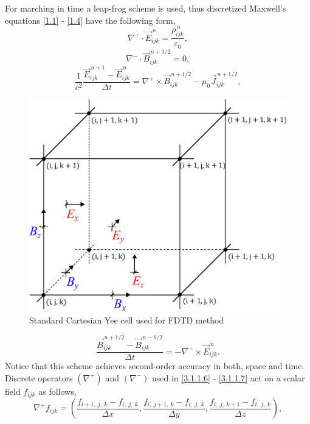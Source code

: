 For marching in time a leap-frog scheme is used, thus discretized Maxwell's equations \ref{1.1} - \ref{1.4} have the following form,
\begin{equation}
\label{3.1.1.6}
\nabla^{+} \cdot \vec{E}_{ijk}^{\,n} = \frac{\rho_{ijk}^{\,n}}{\varepsilon_0},
\end{equation}
\begin{equation}
\label{3.1.1.15}
\nabla^{-} \cdot \vec{B}_{ijk}^{\,n + 1/2} = 0,
\end{equation}
\begin{equation}
\label{3.1.1.16}
\frac{1}{c^{2}} \frac{\vec{E}_{ijk}^{\,n + 1} - \vec{E}_{ijk}^{\,n}}{\Delta t} = \nabla^{+} \times \vec{B}_{ijk}^{\,n + 1/2} - \mu_{0} \vec{J}_{ijk}^{\,n + 1/2},
\end{equation}
\begin{figure}[t]
	\centering
	\includegraphics[width=0.355\paperwidth]{./img/YEE/yee.eps}
	\caption{Standard Cartesian Yee cell used for FDTD method}
	\label{3.1.1.14}
\end{figure}
\begin{equation}
\label{3.1.1.7}
\frac{\vec{B}_{ijk}^{\,n + 1/2} - \vec{B}_{ijk}^{\,n - 1/2}}{\Delta t} = -\nabla^{-} \times \vec{E}_{ijk}^{\,n}.
\end{equation}
Notice that this scheme achieves second-order accuracy in both, space and time. Discrete operators $ \left(\nabla^{+}\right) $ and $ \left(\nabla^{-}\right) $ used in \ref{3.1.1.6} - \ref{3.1.1.7} act on a scalar field $ f_{i j k} $ as follows,
\begin{equation}
\label{3.1.1.8}
\nabla^{+} f_{i j k} = \left(\frac{f_{i + 1,\: j,\: k} - f_{i,\: j,\: k}}{\Delta x}, \frac{f_{i,\: j + 1,\: k} - f_{i,\: j,\: k}}{\Delta y}, \frac{f_{i,\: j,\: k + 1} - f_{i,\: j,\: k}}{\Delta z} \right), 
\end{equation}
